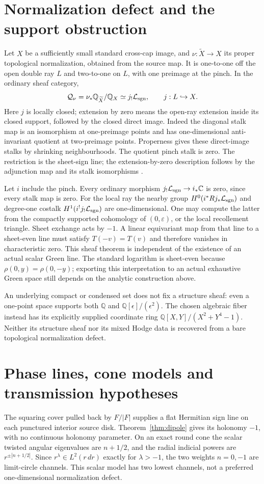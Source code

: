 \documentclass[11pt]{article}
\theoremstyle{readable}
\theoremstyle{remark}\newtheorem{remark}[theorem]{Remark}
\newcommand{\Q}{\mathbb Q}\newcommand{\T}{\mathbb T}
\newcommand{\dd}{\,d}\newcommand{\norm}[1]{\left\lVert#1\right\rVert}
\begin{document}
\section{Normalization defect and the support obstruction}\label{sec:sheaf}
Let $X$ be a sufficiently small standard cross-cap image, and
$\nu:\widetilde X\to X$ its proper topological normalization, obtained from
the source map. It is one-to-one off the open double ray $L$ and two-to-one
on $L$, with one preimage at the pinch. In the ordinary sheaf category,
\[
 \mathcal Q_\nu=\nu_*\Q_{\widetilde X}/\Q_X
\simeq j_!\mathcal L_{\rm sgn},\qquad j:L\hookrightarrow X.
\]
Here $j$ is locally closed; extension by zero means the open-ray extension
inside its closed support, followed by the closed direct image.
Indeed the diagonal stalk map is an isomorphism at one-preimage points and
has one-dimensional anti-invariant quotient at two-preimage points.
Properness gives these direct-image stalks by shrinking neighbourhoods.
The quotient pinch stalk is zero. The restriction is the sheet-sign line;
the extension-by-zero description follows by the adjunction map and its
stalk isomorphisms \cite{stacks}.

Let $i$ include the pinch. Every ordinary morphism
$j_!\mathcal L_{\rm sgn}\to i_*\mathbb C$ is zero, since every stalk map is zero.
For the local ray the nearby group $H^0(i^*Rj_*\mathcal L_{\rm sgn})$
and degree-one costalk $H^1(i^!j_!\mathcal L_{\rm sgn})$ are one-dimensional.
One may compute the latter from the compactly supported cohomology of
$(0,\varepsilon)$, or the local recollement triangle. Sheet exchange acts
by $-1$. A linear equivariant map from that line to a sheet-even line
must satisfy $T(-v)=T(v)$ and therefore vanishes in characteristic zero.
This sheaf theorem is independent of the existence of an actual scalar Green
line. The standard logarithm is sheet-even because
$\rho(0,y)=\rho(0,-y)$; exporting this interpretation to an actual exhaustive
Green space still depends on the analytic construction above.

An underlying compact or condensed set does not fix a structure sheaf:
even a one-point space supports both $\Q$ and $\Q[\epsilon]/(\epsilon^2)$.
The chosen algebraic fiber instead has its explicitly supplied coordinate
ring $\Q[X,Y]/(X^2+Y^4-1)$. Neither its structure sheaf nor its mixed Hodge
data is recovered from a bare topological normalization defect.

\section{Phase lines, cone models and transmission hypotheses}\label{sec:spin}
The squaring cover pulled back by $F/|F|$ supplies a flat Hermitian sign
line on each punctured interior source disk. Theorem~\ref{thm:dipole}
gives its holonomy $-1$, with no continuous holonomy parameter.
On an exact round cone the scalar twisted angular eigenvalues are
$n+1/2$, and the radial indicial powers are $r^{\pm|n+1/2|}$.
Since $r^\lambda\in L^2(r\dd r)$ exactly for $\lambda>-1$, the two
weights $n=0,-1$ are limit-circle channels. This scalar model has two
lowest channels, not a preferred one-dimensional normalization defect.
\end{document}
